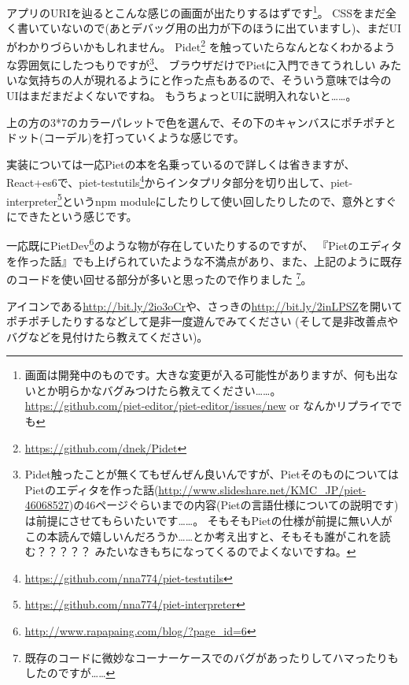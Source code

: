 アプリのURIを辿るとこんな感じの画面が出たりするはずです\footnote{画面は開発中のものです。大きな変更が入る可能性がありますが、何も出ないとか明らかなバグみつけたら教えてください……。
\url{https://github.com/piet-editor/piet-editor/issues/new} or なんかリプライででも}。
CSSをまだ全く書いていないので(あとデバッグ用の出力が下のほうに出ていますし)、まだUIがわかりづらいかもしれません。
Pidet\footnote{\url{https://github.com/dnek/Pidet}}
を触っていたらなんとなくわかるような雰囲気にしたつもりですが\footnote{Pidet触ったことが無くてもぜんぜん良いんですが、PietそのものについてはPietのエディタを作った話(\url{http://www.slideshare.net/KMC_JP/piet-46068527})の46ページぐらいまでの内容(Pietの言語仕様についての説明です)は前提にさせてもらいたいです……。
そもそもPietの仕様が前提に無い人がこの本読んで嬉しいんだろうか……とか考え出すと、そもそも誰がこれを読む？？？？？ みたいなきもちになってくるのでよくないですね。}、
ブラウザだけでPietに入門できてうれしい みたいな気持ちの人が現れるようにと作った点もあるので、そういう意味では今のUIはまだまだよくないですね。 
もうちょっとUIに説明入れないと……。

上の方の3*7のカラーパレットで色を選んで、その下のキャンバスにポチポチとドット(コーデル)を打っていくような感じです。

実装については一応Pietの本を名乗っているので詳しくは省きますが、React+es6で、piet-testutils\footnote{\url{https://github.com/nna774/piet-testutils}}からインタプリタ部分を切り出して、piet-interpreter\footnote{\url{https://github.com/nna774/piet-interpreter}}というnpm moduleにしたりして使い回したりしたので、意外とすぐにできたという感じです。

一応既にPietDev\footnote{\url{http://www.rapapaing.com/blog/?page_id=6}}のような物が存在していたりするのですが、 
『Pietのエディタを作った話』でも上げられていたような不満点があり、また、上記のように既存のコードを使い回せる部分が多いと思ったので作りました
\footnote{既存のコードに微妙なコーナーケースでのバグがあったりしてハマったりもしたのですが……}。

アイコンである\url{http://bit.ly/2io3oCr}や、さっきの\url{http://bit.ly/2inLPSZ}を開いてポチポチしたりするなどして是非一度遊んでみてください
(そして是非改善点やバグなどを見付けたら教えてください)。
